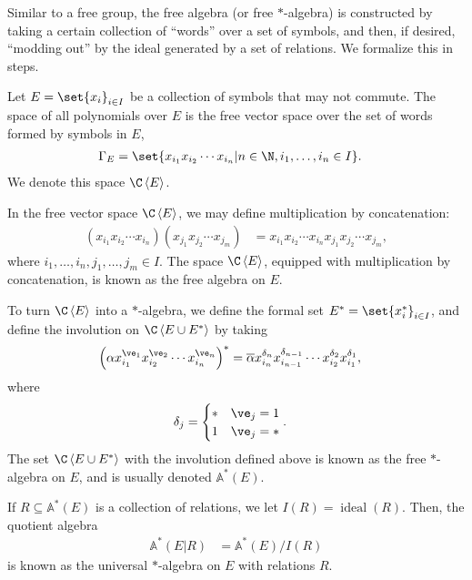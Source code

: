 Similar to a free group, the free algebra (or free $\ast$-algebra) is constructed by taking a certain collection of ``words'' over a set of symbols, and then, if desired, ``modding out'' by the ideal generated by a set of relations. We formalize this in steps.
\begin{definition}
  Let $E=\set{x_i}_{i\in I}$ be a collection of symbols that may not commute. The space of all polynomials over $E$ is the free vector space over the set of words formed by symbols in $E$,
  \begin{align*}
    \Gamma_E &= \set{x_{i_1}x_{i_2}\cdots x_{i_n} | n\in\N,i_1,\dots,i_n\in I}.
  \end{align*}
  We denote this space $\C \left\langle E \right\rangle$.\newline

  In the free vector space $\C \left\langle E \right\rangle$, we may define multiplication by concatenation:
  \begin{align*}
    \left(x_{i_1}x_{i_2}\cdots x_{i_n}\right)\left(x_{j_1}x_{j_2}\cdots x_{j_m}\right) &= x_{i_1}x_{i_2}\cdots x_{i_n}x_{j_1}x_{j_2}\cdots x_{j_m},
  \end{align*}
  where $i_1,\dots,i_n,j_1,\dots,j_m\in I$. The space $\C\left\langle E \right\rangle$, equipped with multiplication by concatenation, is known as the free algebra on $E$.\newline

  To turn $\C\left\langle E \right\rangle$ into a $\ast$-algebra, we define the formal set $E^{\ast} = \set{x_{i}^{\ast}}_{i\in I}$, and define the involution on $\C\left\langle E\cup E^{\ast} \right\rangle$ by taking
  \begin{align*}
    \left(\alpha x_{i_1}^{\ve_1}x_{i_2}^{\ve_2}\cdots x_{i_n}^{\ve_n}\right)^{\ast} &= \overline{\alpha}x_{i_n}^{\delta_n}x_{i_{n-1}}^{\delta_{n-1}}\cdots x_{i_2}^{\delta_2}x_{i_1}^{\delta_1},
  \end{align*}
  where
  \begin{align*}
    \delta_j &= \begin{cases}
      \ast & \ve_j = 1\\
      1 & \ve_j = \ast
    \end{cases}.
  \end{align*}
  The set $\C\left\langle E\cup E^{\ast} \right\rangle$ with the involution defined above is known as the free $\ast$-algebra on $E$, and is usually denoted $\mathbb{A}^{\ast}\left(E\right)$.\newline

  If $R\subseteq \mathbb{A}^{\ast}\left(E\right)$ is a collection of relations, we let $I(R) = \operatorname{ideal}\left(R\right)$. Then, the quotient algebra
  \begin{align*}
    \mathbb{A}^{\ast}\left(E|R\right) &= \mathbb{A}^{\ast}\left(E\right)/I(R)
  \end{align*}
  is known as the universal $\ast$-algebra on $E$ with relations $R$.
\end{definition}
